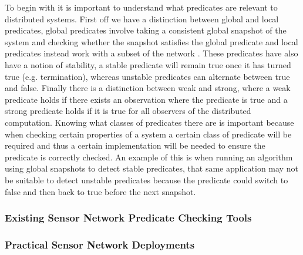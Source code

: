 To begin with it is important to understand what predicates are relevant to distributed systems. First off we have a distinction between global and local predicates, global predicates involve taking a consistent global snapshot of the system and checking whether the snapshot satisfies the global predicate \cite{277788} and local predicates instead work with a subset of the network \cite{553309}. These predicates have also have a notion of stability, a stable predicate will remain true once it has turned true (e.g. termination), whereas unstable predicates can alternate between true and false. Finally there is a distinction between weak and strong, where a weak predicate holds if there exists an observation where the predicate is true and a strong predicate holds if it is true for all observers of the distributed computation\cite{553309,Cooper:1991:CDG:127695.122774}. Knowing what classes of predicates there are is important because when checking certain properties of a system a certain class of predicate will be required and thus a certain implementation will be needed to ensure the predicate is correctly checked. An example of this is when running an algorithm using global snapshots to detect stable predicates, that same application may not be suitable to detect unstable predicates because the predicate could switch to false and then back to true before the next snapshot.

\subsubsection*{Existing Sensor Network Predicate Checking Tools}


\subsubsection*{Practical Sensor Network Deployments}



